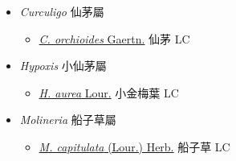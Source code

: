 
  \begin{itemize}
 \item[] \textit{Curculigo} 仙茅屬
                                
  \begin{itemize}
        \item[] \href{http://www.theplantlist.org/tpl1.1/search?q=Curculigo+orchioides}{\textit{C. orchioides} Gaertn.}   仙茅   LC
  \end{itemize}
 \item[] \textit{Hypoxis} 小仙茅屬
                                
  \begin{itemize}
        \item[] \href{http://www.theplantlist.org/tpl1.1/search?q=Hypoxis+aurea}{\textit{H. aurea} Lour.}   小金梅葉   LC
  \end{itemize}
 \item[] \textit{Molineria} 船子草屬
                                
  \begin{itemize}
        \item[] \href{http://www.theplantlist.org/tpl1.1/search?q=Molineria+capitulata}{\textit{M. capitulata} (Lour.) Herb.}   船子草   LC
  \end{itemize}
  \end{itemize}
